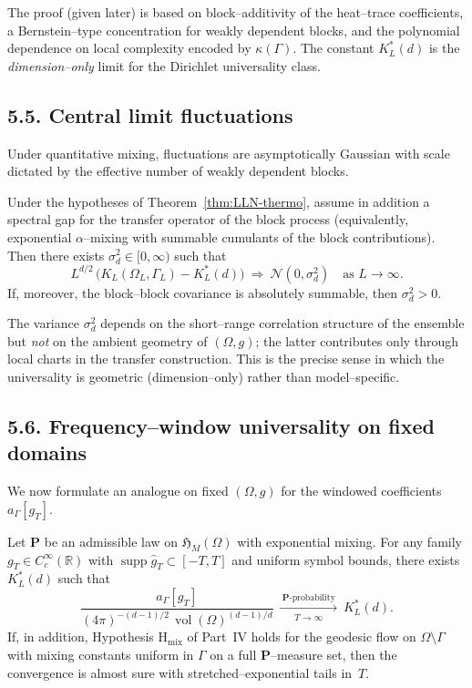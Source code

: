 \noindent
The proof (given later) is based on block–additivity of the heat–trace coefficients, a Bernstein–type concentration for weakly dependent blocks, and the polynomial dependence on local complexity encoded by $\kappa(\Gamma)$. The constant $K^*_L(d)$ is the \emph{dimension–only} limit for the Dirichlet universality class.

\subsection*{5.5. Central limit fluctuations}
Under quantitative mixing, fluctuations are asymptotically Gaussian with scale dictated by the effective number of weakly dependent blocks.

\begin{theorem}\label{thm:CLT-thermo}
Under the hypotheses of Theorem~\ref{thm:LLN-thermo}, assume in addition a spectral gap for the transfer operator of the block process (equivalently, exponential $\alpha$–mixing with summable cumulants of the block contributions). Then there exists $\sigma_d^2\in[0,\infty)$ such that
\[
L^{d/2}\,\Big( K_L(\Omega_L,\Gamma_L) - K^*_L(d)\Big)
\ \Longrightarrow\ \mathcal{N}(0,\sigma_d^2)
\quad\text{as }L\to\infty.
\]
If, moreover, the block–block covariance is absolutely summable, then $\sigma_d^2>0$.
\end{theorem}

\noindent
The variance $\sigma_d^2$ depends on the short–range correlation structure of the ensemble but \emph{not} on the ambient geometry of $(\Omega,g)$; the latter contributes only through local charts in the transfer construction. This is the precise sense in which the universality is geometric (dimension–only) rather than model–specific.

\subsection*{5.6. Frequency–window universality on fixed domains}
We now formulate an analogue on fixed $(\Omega,g)$ for the windowed coefficients $a_\Gamma[g_T]$.

\begin{theorem}\label{thm:LLN-window}
Let $\mathbf{P}$ be an admissible law on $\mathfrak{H}_M(\Omega)$ with exponential mixing. For any family $g_T\in C_c^\infty(\mathbb{R})$ with $\operatorname{supp}\widehat g_T\subset[-T,T]$ and uniform symbol bounds, there exists $K^*_L(d)$ such that
\[
\frac{a_\Gamma[g_T]}{(4\pi)^{-(d-1)/2}\,\operatorname{vol}(\Omega)^{(d-1)/d}}
\ \xrightarrow[T\to\infty]{\ \mathbf{P}\text{-probability}\ }\ K^*_L(d).
\]
If, in addition, Hypothesis H$_{\mathrm{mix}}$ of Part~IV holds for the geodesic flow on $\Omega\setminus\Gamma$ with mixing constants uniform in $\Gamma$ on a full $\mathbf{P}$–measure set, then the convergence is almost sure with stretched–exponential tails in~$T$.
\end{theorem}

